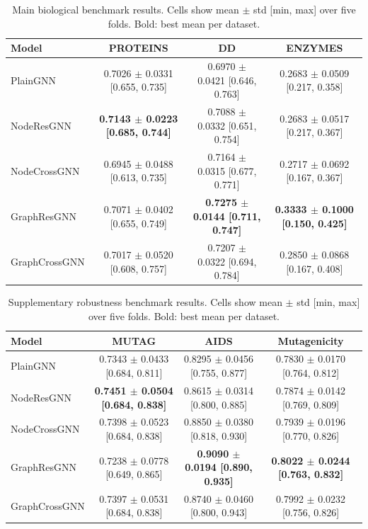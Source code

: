 \begin{table}[t]
\centering
\scriptsize
\setlength{\tabcolsep}{3pt}
\caption{Main biological benchmark results. Cells show mean $\pm$ std [min, max] over five folds. Bold: best mean per dataset.}
\label{tab:all_results_1}
\begin{tabular}{lccc}
\toprule
Model & PROTEINS & DD & ENZYMES \\
\midrule
PlainGNN & 0.7026 $\pm$ 0.0331 [0.655, 0.735] & 0.6970 $\pm$ 0.0421 [0.646, 0.763] & 0.2683 $\pm$ 0.0509 [0.217, 0.358] \\
NodeResGNN & \textbf{0.7143 $\pm$ 0.0223 [0.685, 0.744]} & 0.7088 $\pm$ 0.0332 [0.651, 0.754] & 0.2683 $\pm$ 0.0517 [0.217, 0.367] \\
NodeCrossGNN & 0.6945 $\pm$ 0.0488 [0.613, 0.735] & 0.7164 $\pm$ 0.0315 [0.677, 0.771] & 0.2717 $\pm$ 0.0692 [0.167, 0.367] \\
GraphResGNN & 0.7071 $\pm$ 0.0402 [0.655, 0.749] & \textbf{0.7275 $\pm$ 0.0144 [0.711, 0.747]} & \textbf{0.3333 $\pm$ 0.1000 [0.150, 0.425]} \\
GraphCrossGNN & 0.7017 $\pm$ 0.0520 [0.608, 0.757] & 0.7207 $\pm$ 0.0322 [0.694, 0.784] & 0.2850 $\pm$ 0.0868 [0.167, 0.408] \\
\bottomrule
\end{tabular}
\end{table}

\begin{table}[t]
\centering
\scriptsize
\setlength{\tabcolsep}{3pt}
\caption{Supplementary robustness benchmark results. Cells show mean $\pm$ std [min, max] over five folds. Bold: best mean per dataset.}
\label{tab:all_results_2}
\begin{tabular}{lccc}
\toprule
Model & MUTAG & AIDS & Mutagenicity \\
\midrule
PlainGNN & 0.7343 $\pm$ 0.0433 [0.684, 0.811] & 0.8295 $\pm$ 0.0456 [0.755, 0.877] & 0.7830 $\pm$ 0.0170 [0.764, 0.812] \\
NodeResGNN & \textbf{0.7451 $\pm$ 0.0504 [0.684, 0.838]} & 0.8615 $\pm$ 0.0314 [0.800, 0.885] & 0.7874 $\pm$ 0.0142 [0.769, 0.809] \\
NodeCrossGNN & 0.7398 $\pm$ 0.0523 [0.684, 0.838] & 0.8850 $\pm$ 0.0380 [0.818, 0.930] & 0.7939 $\pm$ 0.0196 [0.770, 0.826] \\
GraphResGNN & 0.7238 $\pm$ 0.0778 [0.649, 0.865] & \textbf{0.9090 $\pm$ 0.0194 [0.890, 0.935]} & \textbf{0.8022 $\pm$ 0.0244 [0.763, 0.832]} \\
GraphCrossGNN & 0.7397 $\pm$ 0.0531 [0.684, 0.838] & 0.8740 $\pm$ 0.0460 [0.800, 0.943] & 0.7992 $\pm$ 0.0232 [0.756, 0.826] \\
\bottomrule
\end{tabular}
\end{table}

